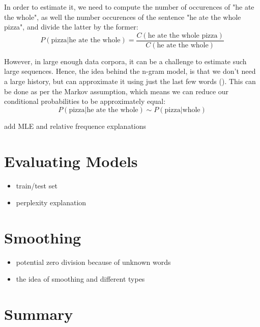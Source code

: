 In order to estimate it, we need to compute the number of occurences of "he ate the whole", as well the number occurences of the sentence "he ate the whole pizza", and divide the latter by the former:
\begin{equation}
    P(\text{pizza}|\text{he ate the whole})=\frac{C(\text{he ate the whole pizza})}{C(\text{he ate the whole})}
\end{equation}

However, in large enough data corpora, it can be a challenge to estimate such large sequences. Hence, the idea behind the n-gram model, is that we don't need a large history, but can approximate it using just the last few words (\cite{Jura09a}). This can be done as per the Markov assumption, which means we can reduce our conditional probabilities to be approximately equal:
\begin{equation}
    P(\text{pizza}|\text{he ate the whole}) \sim P(\text{pizza}|\text{whole})
\end{equation}

add MLE and relative frequence explanations

\section{Evaluating Models}
\begin{itemize}
    \item train/test set
    \item perplexity explanation
\end{itemize}

\section{Smoothing}
\begin{itemize}
    \item potential zero division because of unknown words
    \item the idea of smoothing and different types
\end{itemize}

\section{Summary}